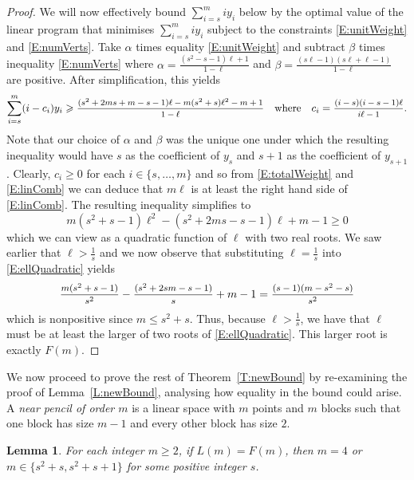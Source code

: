 \documentclass[11pt]{article}
\newtheorem{Lemma}[Theorem]{Lemma}
\theoremstyle{definition}
\renewcommand{\leq}{\leqslant}
\renewcommand{\geq}{\geqslant}
\begin{document}
\begin{proof}
We will now effectively bound $\sum_{i=s}^m iy_i$ below by the optimal value of the linear program that minimises $\sum_{i=s}^m iy_i$ subject to the constraints \eqref{E:unitWeight} and \eqref{E:numVerts}. Take $\alpha$ times equality \eqref{E:unitWeight} and subtract $\beta$ times inequality \eqref{E:numVerts} where $\alpha=\frac{(s^2-s-1)\ell+1}{1-\ell}$ and $\beta=\frac{(s\ell-1)(s\ell+\ell-1)}{1-\ell}$ are positive. After simplification, this yields
\begin{equation}\label{E:linComb}
\sum_{i=s}^m (i-c_i)y_i \geq \mfrac{(s^2+2ms+m-s-1)\ell-m(s^2+s)\ell^2-m+1}{1-\ell}\text{~~~where~~~} c_i=\mfrac{(i-s)(i-s-1)\ell}{i\ell-1}.
\end{equation}
Note that our choice of $\alpha$ and $\beta$ was the unique one under which the resulting inequality would have $s$ as the coefficient of $y_s$ and $s+1$ as the coefficient of $y_{s+1}$. Clearly, $c_i \geq 0$ for each $i \in \{s,\ldots,m\}$ and so from \eqref{E:totalWeight} and \eqref{E:linComb} we can deduce that $m\ell$ is at least the right hand side of \eqref{E:linComb}. The resulting inequality simplifies to
\begin{equation}\label{E:ellQuadratic}
m(s^2+s-1)\ell^2-(s^2+2ms-s-1)\ell + m-1 \geq 0
\end{equation}
which we can view as a quadratic function of $\ell$ with two real roots. We saw earlier that $\ell > \frac{1}{s}$ and we now observe that substituting $\ell=\frac{1}{s}$ into \eqref{E:ellQuadratic}
yields
\[\mfrac{m(s^2+s-1)}{s^2} - \mfrac{(s^2 +2sm -s-1)}{s} +m-1 = \mfrac{(s-1)(m-s^2-s)}{s^2}\]
which is nonpositive since $m \leq s^2+s$. Thus, because $\ell > \frac{1}{s}$, we have that $\ell$ must be at least the larger of two roots of \eqref{E:ellQuadratic}. This larger root is exactly $F(m)$.
\end{proof}


We now proceed to prove the rest of Theorem~\ref{T:newBound} by re-examining the proof of Lemma~\ref{L:newBound}, analysing how equality in the bound could arise. A \emph{near pencil of order $m$} is a linear space with $m$ points and $m$ blocks such that one block has size $m-1$ and every other block has size $2$.

\begin{Lemma}\label{L:newBoundEquality}
For each integer $m \geq 2$, if $L(m)=F(m)$, then $m=4$ or $m \in \{s^2+s,s^2+s+1\}$ for some positive integer $s$.
\end{Lemma}
\end{document}
